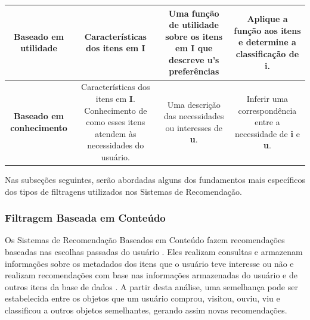 \begin{table}[]
\begin{tabular}{|c|c|c|c|}
	\rowcolor[HTML]{EFEFEF} 
	\textbf{Baseado em utilidade} & \begin{minipage} [t] {0.2\textwidth} \centering Características dos itens em \textbf{I} \end{minipage}  & \begin{minipage} [t] {0.2\textwidth} 
		Uma função de utilidade sobre os itens em \textbf{I} que descreve \textbf{u}'s preferências \end{minipage}   & \begin{minipage} [t] {0.2\textwidth} Aplique a função aos itens e determine a classificação de \textbf{i}.  \end{minipage}  \\ \hline
	\textbf{Baseado em conhecimento}  & \begin{minipage} [t] {0.2\textwidth} \centering Características dos itens em \textbf{I}. Conhecimento de como esses itens atendem às necessidades do usuário.  \end{minipage}  & \begin{minipage} [t] {0.2\textwidth} Uma descrição das necessidades ou interesses de \textbf{u}.\end{minipage}  &  \begin{minipage} [t] {0.2\textwidth}  
		Inferir uma correspondência entre a necessidade de \textbf{i} e \textbf{u}. \end{minipage} \\ \hline
	\end{tabular}
\end{table}



Nas subseções seguintes, serão abordadas alguns dos fundamentos mais específicos dos tipos de filtragens utilizados nos Sistemas de Recomendação.


\subsubsection{Filtragem Baseada em Conteúdo}


Os Sistemas de Recomendação Baseados em Conteúdo fazem recomendações baseadas nas escolhas passadas do usuário \cite{bobadilla2013}. 
Eles realizam consultas e armazenam informações sobre os metadados dos itens que o usuário teve interesse ou não e realizam recomendações 
com base nas informações armazenadas do usuário e de outros itens da base de dados \cite{mauricio}. A partir desta análise, uma semelhança pode ser
estabelecida entre os objetos que um usuário comprou, visitou, ouviu, viu e classificou a outros objetos semelhantes, gerando assim novas recomendações. 

